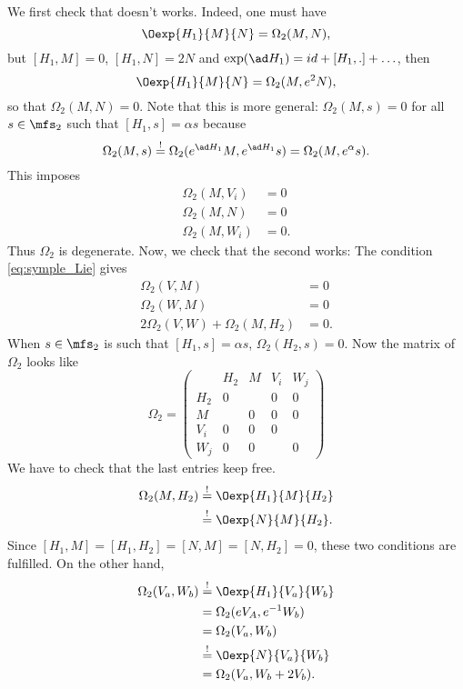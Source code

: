 We first check that
doesn't works.
Indeed, one must have
\[
   \Oexp{H_1}{M}{N}=\Omega_2(M,N),
\]
but $[H_1,M]=0$, $[H_1,N]=2N$ and $\exp(\ad H_1)=id+[H_1,.]+\ldots$, then
\[
  \Oexp{H_1}{M}{N}=\Omega_2(M,e^2N),
\]
so that $\Omega_2(M,N)=0$.
Note that this is more general: $\Omega_2(M,s)=0$ for all $s\in\mfs_2$ such that $[H_1,s]=\alpha s$ because
\[
   \Omega_2(M,s)\stackrel{!}{=}\Omega_2(e^{\ad H_1}M,e^{\ad H_1}s)=\Omega_2(M,e^{\alpha}s).
\]
This imposes
\begin{equation}
\begin{split}
   \Omega_2(M,V_i)&=0\\
   \Omega_2(M,N)&=0\\
   \Omega_2(M,W_i)&=0.
\end{split}
\end{equation}
Thus $\Omega_2$ is degenerate. Now, we check that the second works:
The condition \eqref{eq:symple_Lie} gives
\begin{equation}
\begin{split}
   \Omega_2(V,M)&=0\\
   \Omega_2(W,M)&=0\\
   2\Omega_2(V,W)+\Omega_2(M,H_2)&=0.
\end{split}
\end{equation}
When $s\in\mfs_2$ is such that $[H_1,s]=\alpha s$, $\Omega_2(H_2,s)=0$. Now the matrix of $\Omega_2$ looks like
\begin{equation}
\Omega_2=\left(
\begin{array}{c|c|c|c|c}
 & H_2 & M & V_i & W_j \\
 \hline
H_2 & 0 &  & 0 & 0 \\
\hline
M &  & 0 & 0 & 0 \\
\hline
V_i & 0 & 0 & 0 &  \\
\hline
W_j & 0 & 0 &  & 0
\end{array}
\right)
\end{equation}
We have to check that the last entries keep free.
\begin{equation} \begin{split}
   \Omega_2(M,H_2)&\stackrel{!}{=}\Oexp{H_1}{M}{H_2}\\
                  &\stackrel{!}{=}\Oexp{N}{M}{H_2}.
\end{split}
\end{equation}
Since $[H_1,M]=[H_1,H_2]=[N,M]=[N,H_2]=0$, these two conditions are fulfilled. On the other hand,
\begin{equation}
\begin{split}
   \Omega_2(V_a,W_b)&\stackrel{!}{=}\Oexp{H_1}{V_a}{W_b}\\
                    &=\Omega_2(eV_A,e^{-1} W_b)\\
		    &=\Omega_2(V_a,W_b)\\
		    &\stackrel{!}{=}\Oexp{N}{V_a}{W_b}\\
		    &=\Omega_2(V_a,W_b+2V_b).
\end{split}
\end{equation}
